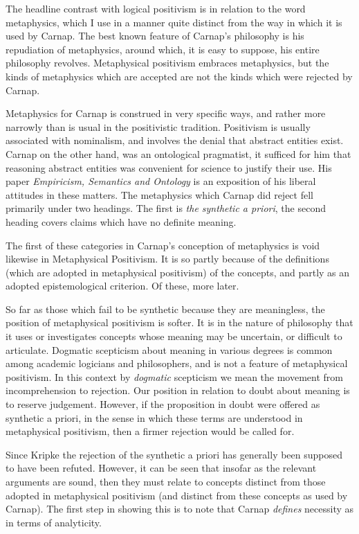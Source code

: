 The headline contrast with logical positivism is in relation to the
word metaphysics, which I use in a manner quite distinct from the way
in which it is used by Carnap.
The best known feature of Carnap's philosophy is his repudiation of
metaphysics, around which, it is easy to suppose, his entire philosophy
revolves.
Metaphysical positivism embraces metaphysics, but the kinds of
metaphysics which are accepted are not the kinds which were rejected
by Carnap.

Metaphysics for Carnap is construed in very specific ways, and rather
more narrowly than is usual in the positivistic tradition.
Positivism is usually associated with nominalism, and involves the
denial that abstract entities exist.
Carnap on the other hand, was an ontological pragmatist, it sufficed
for him that reasoning abstract entities was convenient for science to
justify their use.
His paper \emph{Empiricism, Semantics and Ontology} is an exposition
of his liberal attitudes in these matters.
The metaphysics which Carnap did reject fell primarily under two
headings.
The first is \emph{the synthetic a priori}, the second heading covers
claims which have no definite meaning.

The first of these categories in Carnap's conception of metaphysics is
void likewise in Metaphysical Positivism.
It is so partly because of the definitions (which are adopted in
metaphysical positivism) of the concepts, and partly as an adopted
epistemological criterion.
Of these, more later.

So far as those which fail to be synthetic because they are
meaningless, the position of metaphysical positivism is softer.
It is in the nature of philosophy that it uses or investigates
concepts whose meaning may be uncertain, or difficult to articulate.
Dogmatic scepticism about meaning in various degrees is common among
academic logicians and philosophers, and is not a feature of
metaphysical positivism.
In this context by \emph{dogmatic} scepticism we mean the movement
from incomprehension to rejection.
Our position in relation to doubt about meaning is to reserve
judgement.
However, if the proposition in doubt were offered as synthetic a
  priori, in the sense in which these terms are understood in
  metaphysical positivism, then a firmer rejection would be called for. 

Since Kripke the rejection of the synthetic a priori has generally
been supposed to have been refuted.
However, it can be seen that insofar as the relevant arguments are
sound, then they must relate to concepts distinct from those adopted
in metaphysical positivism (and distinct from these concepts as used
by Carnap).
The first step in showing this is to note that Carnap \emph{defines}
necessity as in terms of analyticity.

